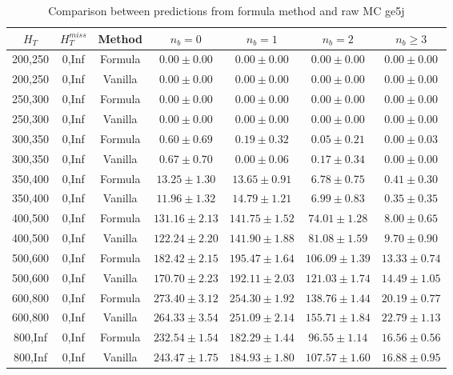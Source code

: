 \begin{longtable}{ | c | c | c | c | c | c | c | }
\caption{Comparison between predictions from formula method and raw MC ge5j} \label{tab:formula-ge5j} \\    \hline 
$H_{T}$ & $H_{T}^{miss}$ & Method & $n_{b} = 0$ & $n_{b} = 1$ & $n_{b} = 2$ & $n_{b} \ge 3$ \\ \hline200,250 & 0,Inf & Formula  & $     0.00 \pm  0.00 $ & $     0.00 \pm  0.00 $ & $     0.00 \pm  0.00 $ & $     0.00 \pm  0.00 $  \\  
200,250 & 0,Inf & Vanilla  & $     0.00 \pm  0.00 $ & $     0.00 \pm  0.00 $ & $     0.00 \pm  0.00 $ & $     0.00 \pm  0.00 $  \\ \hline 
250,300 & 0,Inf & Formula  & $     0.00 \pm  0.00 $ & $     0.00 \pm  0.00 $ & $     0.00 \pm  0.00 $ & $     0.00 \pm  0.00 $  \\  
250,300 & 0,Inf & Vanilla  & $     0.00 \pm  0.00 $ & $     0.00 \pm  0.00 $ & $     0.00 \pm  0.00 $ & $     0.00 \pm  0.00 $  \\ \hline 
300,350 & 0,Inf & Formula  & $     0.60 \pm  0.69 $ & $     0.19 \pm  0.32 $ & $     0.05 \pm  0.21 $ & $     0.00 \pm  0.03 $  \\  
300,350 & 0,Inf & Vanilla  & $     0.67 \pm  0.70 $ & $     0.00 \pm  0.06 $ & $     0.17 \pm  0.34 $ & $     0.00 \pm  0.00 $  \\ \hline 
350,400 & 0,Inf & Formula  & $    13.25 \pm  1.30 $ & $    13.65 \pm  0.91 $ & $     6.78 \pm  0.75 $ & $     0.41 \pm  0.30 $  \\  
350,400 & 0,Inf & Vanilla  & $    11.96 \pm  1.32 $ & $    14.79 \pm  1.21 $ & $     6.99 \pm  0.83 $ & $     0.35 \pm  0.35 $  \\ \hline 
400,500 & 0,Inf & Formula  & $   131.16 \pm  2.13 $ & $   141.75 \pm  1.52 $ & $    74.01 \pm  1.28 $ & $     8.00 \pm  0.65 $  \\  
400,500 & 0,Inf & Vanilla  & $   122.24 \pm  2.20 $ & $   141.90 \pm  1.88 $ & $    81.08 \pm  1.59 $ & $     9.70 \pm  0.90 $  \\ \hline 
500,600 & 0,Inf & Formula  & $   182.42 \pm  2.15 $ & $   195.47 \pm  1.64 $ & $   106.09 \pm  1.39 $ & $    13.33 \pm  0.74 $  \\  
500,600 & 0,Inf & Vanilla  & $   170.70 \pm  2.23 $ & $   192.11 \pm  2.03 $ & $   121.03 \pm  1.74 $ & $    14.49 \pm  1.05 $  \\ \hline 
600,800 & 0,Inf & Formula  & $   273.40 \pm  3.12 $ & $   254.30 \pm  1.92 $ & $   138.76 \pm  1.44 $ & $    20.19 \pm  0.77 $  \\  
600,800 & 0,Inf & Vanilla  & $   264.33 \pm  3.54 $ & $   251.09 \pm  2.14 $ & $   155.71 \pm  1.84 $ & $    22.79 \pm  1.13 $  \\ \hline 
800,Inf & 0,Inf & Formula  & $   232.54 \pm  1.54 $ & $   182.29 \pm  1.44 $ & $    96.55 \pm  1.14 $ & $    16.56 \pm  0.56 $  \\  
800,Inf & 0,Inf & Vanilla  & $   243.47 \pm  1.75 $ & $   184.93 \pm  1.80 $ & $   107.57 \pm  1.60 $ & $    16.88 \pm  0.95 $  \\ \hline 
    \hline 
    \hline 
\end{longtable}